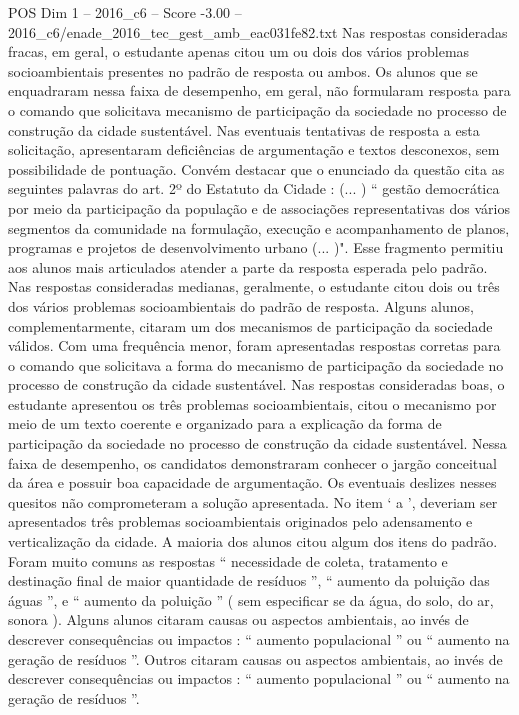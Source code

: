 \begin{textsample}{POS Dim 1 – 2016\_c6 – Score -3.00 – 2016\_c6/enade\_2016\_tec\_gest\_amb\_eac031fe82.txt}
Nas respostas consideradas fracas, em geral, o estudante apenas citou um ou dois dos vários problemas socioambientais presentes no padrão de resposta ou ambos.
Os alunos que se enquadraram nessa faixa de desempenho, em geral, não formularam resposta para o comando que solicitava mecanismo de participação da sociedade no processo de construção da cidade sustentável.
Nas eventuais tentativas de resposta a esta solicitação, apresentaram deficiências de argumentação e textos desconexos, sem possibilidade de pontuação.
Convém destacar que o enunciado da questão cita as seguintes palavras do art. 2º do Estatuto da Cidade : (... ) “ gestão democrática por meio da participação da população e de associações representativas dos vários segmentos da comunidade na formulação, execução e acompanhamento de planos, programas e projetos de desenvolvimento urbano (... )".
Esse fragmento permitiu aos alunos mais articulados atender a parte da resposta esperada pelo padrão.
Nas respostas consideradas medianas, geralmente, o estudante citou dois ou três dos vários problemas socioambientais do padrão de resposta.
Alguns alunos, complementarmente, citaram um dos mecanismos de participação da sociedade válidos.
Com uma frequência menor, foram apresentadas respostas corretas para o comando que solicitava a forma do mecanismo de participação da sociedade no processo de construção da cidade sustentável.
Nas respostas consideradas boas, o estudante apresentou os três problemas socioambientais, citou o mecanismo por meio de um texto coerente e organizado para a explicação da forma de participação da sociedade no processo de construção da cidade sustentável.
Nessa faixa de desempenho, os candidatos demonstraram conhecer o jargão conceitual da área e possuir boa capacidade de argumentação.
Os eventuais deslizes nesses quesitos não comprometeram a solução apresentada.
No item ‘ a ’, deveriam ser apresentados três problemas socioambientais originados pelo adensamento e verticalização da cidade.
A maioria dos alunos citou algum dos itens do padrão.
Foram muito comuns as respostas “ necessidade de coleta, tratamento e destinação final de maior quantidade de resíduos ”, “ aumento da poluição das águas ”, e “ aumento da poluição ” ( sem especificar se da água, do solo, do ar, sonora ).
Alguns alunos citaram causas ou aspectos ambientais, ao invés de descrever consequências ou impactos : “ aumento populacional ” ou “ aumento na geração de resíduos ”.
Outros citaram causas ou aspectos ambientais, ao invés de descrever consequências ou impactos : “ aumento populacional ” ou “ aumento na geração de resíduos ”.

\end{textsample}
